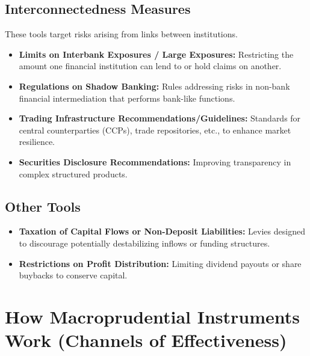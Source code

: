\subsection{Interconnectedness Measures}
These tools target risks arising from links between institutions.
\begin{itemize}
    \item \textbf{Limits on Interbank Exposures / Large Exposures:} Restricting the amount one financial institution can lend to or hold claims on another.
    \item \textbf{Regulations on Shadow Banking:} Rules addressing risks in non-bank financial intermediation that performs bank-like functions.
    \item \textbf{Trading Infrastructure Recommendations/Guidelines:} Standards for central counterparties (CCPs), trade repositories, etc., to enhance market resilience.
    \item \textbf{Securities Disclosure Recommendations:} Improving transparency in complex structured products.
\end{itemize}

\subsection{Other Tools}
\begin{itemize}
    \item \textbf{Taxation of Capital Flows or Non-Deposit Liabilities:} Levies designed to discourage potentially destabilizing inflows or funding structures.
    \item \textbf{Restrictions on Profit Distribution:} Limiting dividend payouts or share buybacks to conserve capital.
\end{itemize}

\section{How Macroprudential Instruments Work (Channels of Effectiveness)}

